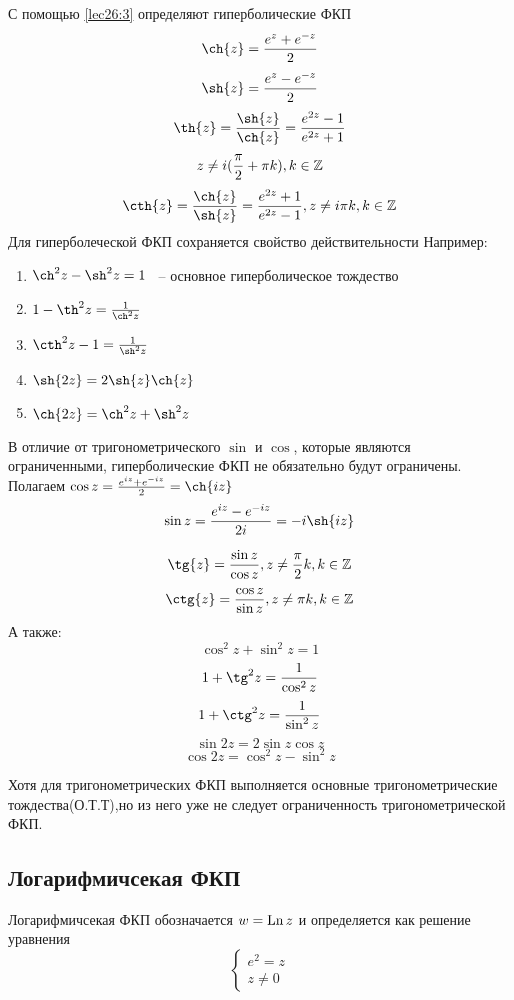 \documentclass[../../main.tex]{subfiles}
\begin{document}
С помощью \eqref{lec26:3} определяют гиперболические ФКП
\[
 \ch{z} = \frac{e^z + e^{-z}}{2}
\]
\[
 \sh{z} = \frac{e^z - e^{-z}}{2}
\]
\[
 \th{z} = \frac{\sh{z}}{\ch{z}} = \frac{e^{2z} - 1}{e^{2z} + 1}
\]
\[
 z \neq i(\frac{\pi}{2} + \pi k), k \in \mathbb{Z}
\]
\[
 \cth{z} = \frac{\ch{z}}{\sh{z}} =
 \frac{e^{2z} + 1}{e^{2z} - 1}, z \neq i \pi k, k \in \Z
\]
Для гиперболеческой ФКП сохраняется свойство действительности
Например:
\begin{enumerate}
 \item $\ch^{2}{z} - \sh^{2}{z} = 1$  ~-- основное гиперболическое тождество
 \item $1 - \th^{2}{z} = \frac{1}{\ch^{2}{z}}$
 \item $\cth^{2}{z} - 1= \frac{1}{\sh^{2}{z}}$
 \item $\sh{2z} = 2\sh{z} \ch{z}$
 \item $\ch{2z} = \ch^{2}{z} + \sh^{2}{z}$
\end{enumerate}

В отличие от тригонометрического $\sin$ и $\cos$, которые являются 
ограниченными, гиперболические ФКП не обязательно будут ограничены.\\
Полагаем $\cos{z} = \frac{e^{iz} + e^{-iz}}{2} = \ch{iz}$
\[
 \sin{z} = \frac{e^{iz} - e^{-iz}}{2i} = -i \sh{iz}
\]

\[
 \tg{z} = \frac{\sin{z}}{\cos{z}}, z \neq \frac{\pi}{2} k, k \in \Z
\]
\[
 \ctg{z} = \frac{\cos{z}}{\sin{z}}, z \neq \pi k, k \in \Z
\]
А также:
\[
 \cos^2{z} + \sin^2{z} = 1
\]
\[
 1 + \tg^{2}{z} = \frac{1}{\cos^2{z}}
\]
\[
 1 + \ctg^{2}{z} = \frac{1}{\sin^2{z}}
\]
\[
 \sin{2z} = 2 \sin{z} \cos{z}
\]
\[
 \cos{2z} = \cos^{2}{z} -  \sin^{2}{z}
\]

Хотя для тригонометрических ФКП выполняется основные тригонометрические
тождества(О.Т.Т),но из него уже не следует ограниченность 
тригонометрической ФКП.

\subsection{Логарифмичсекая ФКП}
Логарифмичсекая ФКП обозначается $w = \operatorname{\operatorname{Ln}}{z}$ 
и определяется как решение уравнения 
\begin{equation}
 \label{lec26;4}
 \begin{cases}
   e^{2} = z \\
   z \neq 0
 \end{cases}
\end{equation}

 
\end{document}
